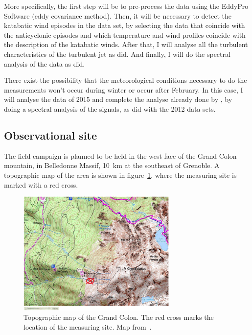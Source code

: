 \documentclass[a4paper,12pt]{article}
\begin{document}
More specifically, the first step will be to pre-process the data using the EddyPro Software (eddy covariance method). Then, it will be necessary to detect the katabatic wind episodes in the data set, by selecting the data that coincide with the anticyclonic episodes and which temperature and wind profiles coincide with the description of the katabatic winds. After that, I will analyse all the turbulent characteristics of the turbulent jet as \citeauthor{jakob} did. And finally, I will do the spectral analysis of the data as \citeauthor{claudine} did. 

There exist the possibility that the meteorological conditions necessary to do the measurements won't occur during winter or occur after February. In this case, I will analyse the data of 2015 and complete the analyse already done by \citeauthor{jakob}, by doing a spectral analysis of the signals, as \citeauthor{claudine} did with the 2012 data sets.

\subsection{Observational site}

The field campaign is planned to be held in the west face of the Grand Colon mountain, in Belledonne Massif, 10~km at the southeast of Grenoble. A topographic map of the area is shown in figure~\ref{fig:obs_site}, where the measuring site is marked with a red cross.

\begin{figure}[!ht]
  \begin{center}
  \includegraphics[width=0.7\textwidth]{fig/grand_colon_jakob.png}
  \caption{Topographic map of the Grand Colon. The red cross marks the location of the measuring site. Map from~\cite{jakob}.}
  \label{fig:obs_site}
  \end{center}
\end{figure}
\end{document}
